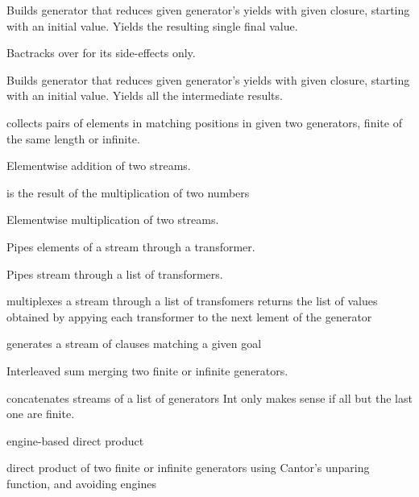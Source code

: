 \documentclass[11pt]{article}
\begin{document}
\begin{description}
Builds generator that reduces given generator's yields with given closure,
starting with an initial value. Yields the resulting single final value.

Bactracks over  for its side-effects only. 

Builds generator that reduces given generator's yields with given closure,
starting with an initial value. Yields all the intermediate results.

 collects pairs of elements in matching positions
in given two generators, finite of the same length or infinite.

Elementwise addition of two streams.

 is the result of the multiplication of two numbers

Elementwise multiplication of two streams.

Pipes elements of a stream through a transformer.

Pipes stream through a list of transformers.

multiplexes a stream through a list of transfomers
returns the list of values obtained by appying each
transformer to the next lement of the generator

generates a stream of clauses matching a given goal

Interleaved sum merging two finite or infinite generators.

concatenates streams of a list of generators
Int only makes sense if all but the last one are finite.

engine-based direct product

direct product of two finite or infinite generators
using Cantor's unparing function, and avoiding engines


\end{description}
\end{document}
